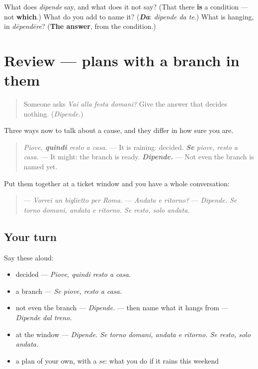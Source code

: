\begin{tcolorbox}[breakable,colback=teal!4,colframe=teal!35!black,title={Before you move on}]
What does \emph{dipende} say, and what does it not say? (That there \textbf{is} a condition — not \textbf{which}.) What do you add to name it? (\emph{\textbf{Da}}: \emph{dipende da te}.) What is hanging, in \emph{dēpendēre}? (\textbf{The answer}, from the condition.)
\end{tcolorbox}
\section[(review)]{Review — plans with a branch in them}

\label{lesson:IT-C271-ripasso-condizioni}



\begin{quote}
Someone asks \emph{Vai alla festa domani?} Give the answer that decides nothing. (\emph{Dipende.})
\end{quote}

\begin{grammarlens}[title={What you've built}]
Three ways now to talk about a cause, and they differ in how sure you are.

\begin{quote}
\emph{Piove, \textbf{quindi} resto a casa.} — It is raining: decided. \emph{\textbf{Se} piove, resto a casa.} — It might: the branch is ready. \emph{\textbf{Dipende.}} — Not even the branch is named yet.
\end{quote}

Put them together at a ticket window and you have a whole conversation:

\begin{quote}
— \emph{Vorrei un biglietto per Roma.} — \emph{Andata e ritorno?} — \emph{Dipende. Se torno domani, andata e ritorno. Se resto, solo andata.}
\end{quote}
\end{grammarlens}

\subsection*{Your turn}
Say these aloud:

\begin{itemize}
\raggedright
  \item decided — \emph{Piove, quindi resto a casa.}
  \item a branch — \emph{Se piove, resto a casa.}
  \item not even the branch — \emph{Dipende.} — then name what it hangs from — \emph{Dipende dal treno.}
  \item at the window — \emph{Dipende. Se torno domani, andata e ritorno. Se resto, solo andata.}
  \item a plan of your own, with a \emph{se}: what you do if it rains this weekend
\end{itemize}

